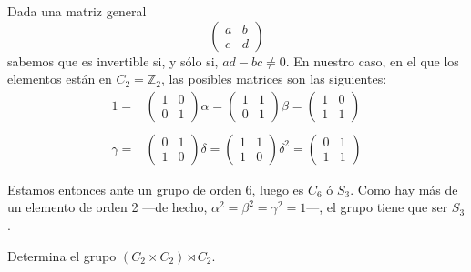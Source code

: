 \documentclass[a4paper, 11pt]{article}
\begin{document}
\begin{solucion}
      Dada una matriz general
      \[
      \left(
      \begin{array}{cc}
          a & b \\
          c & d
      \end{array}
      \right)
      \]
      sabemos que es invertible si, y sólo si, $ad-bc \neq 0$. En nuestro caso, en el que los elementos están en $C_2 = \mathbb{Z}_2$, las posibles matrices son las siguientes:
      \begin{align*}
          1 = &\left(\begin{array}{cc} 1&0 \\ 0&1 \end{array}\right)
          \alpha = \left(\begin{array}{cc} 1&1 \\ 0&1 \end{array}\right)
          \beta = \left(\begin{array}{cc} 1&0 \\ 1&1 \end{array}\right) \\
          \\
          \gamma = &\left(\begin{array}{cc} 0&1 \\ 1&0 \end{array}\right)
          \delta = \left(\begin{array}{cc} 1&1 \\ 1&0 \end{array}\right)
          \delta^2 = \left(\begin{array}{cc} 0&1 \\ 1&1 \end{array}\right)
      \end{align*}

      Estamos entonces ante un grupo de orden 6, luego es $C_6$ ó $S_3$. Como hay más de un elemento de orden 2 ---de hecho, $\alpha^2 = \beta^2 = \gamma^2 = 1$---, el grupo tiene que ser $S_3$.
  \end{solucion}

  \begin{apartado}
      Determina el grupo $(C_2 \times C_2) \rtimes C_2$.
  \end{apartado}
\end{document}
